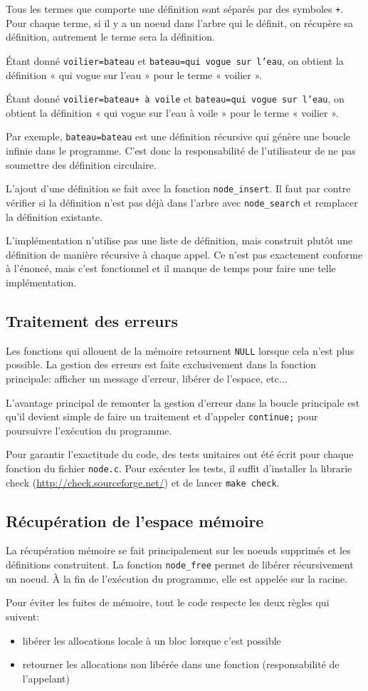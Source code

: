\documentclass{article}
\begin{document}
Tous les termes que comporte une définition sont séparés par des symboles
\texttt{+}. Pour chaque terme, si il y a un noeud dans l'arbre qui le définit,
on récupère sa définition, autrement le terme sera la définition.

Étant donné \texttt{voilier=bateau} et \texttt{bateau=qui vogue sur l'eau}, on
obtient la définition « qui vogue sur l'eau » pour le terme « voilier ».

Étant donné \texttt{voilier=bateau+ à voile} et
\texttt{bateau=qui vogue sur l'eau}, on obtient la définition « qui vogue sur
l'eau à voile » pour le terme « voilier ».

Par exemple, \texttt{bateau=bateau} est une définition récursive qui génère une
boucle infinie dans le programme. C'est donc la responsabilité de l'utilisateur
de ne pas soumettre des définition circulaire.

L'ajout d'une définition se fait avec la fonction \texttt{node\_insert}. Il faut
par contre vérifier si la définition n'est pas déjà dans l'arbre avec
\texttt{node\_search} et remplacer la définition existante.

L'implémentation n'utilise pas une liste de définition, mais construit plutôt
une définition de manière récursive à chaque appel. Ce n'est pas exactement
conforme à l'énoncé, mais c'est fonctionnel et il manque de temps pour faire une
telle implémentation.

\subsection{Traitement des erreurs}
Les fonctions qui allouent de la mémoire retournent \texttt{NULL} lorsque cela
n'est plus possible. La gestion des erreurs est faite exclusivement dans la
fonction principale: afficher un message d'erreur, libérer de l'espace, etc...

L'avantage principal de remonter la gestion d'erreur dans la boucle principale
est qu'il devient simple de faire un traitement et d'appeler \texttt{continue;}
pour poursuivre l'exécution du programme.

Pour garantir l'exactitude du code, des tests unitaires ont été écrit pour
chaque fonction du fichier \texttt{node.c}. Pour exécuter les tests, il suffit
d'installer la librarie check (\url{http://check.sourceforge.net/}) et de lancer
\texttt{make check}.

\subsection{Récupération de l'espace mémoire}
La récupération mémoire se fait principalement sur les noeuds supprimés et les
définitions construitent. La fonction \texttt{node\_free} permet de libérer
récursivement un noeud. À la fin de l'exécution du programme, elle est appelée
sur la racine.

Pour éviter les fuites de mémoire, tout le code respecte les deux règles qui
suivent:
\begin{itemize}
\item libérer les allocations locale à un bloc lorsque c'est possible
\item retourner les allocations non libérée dans une fonction (responsabilité de
l'appelant)
\end{itemize}
\end{document}
